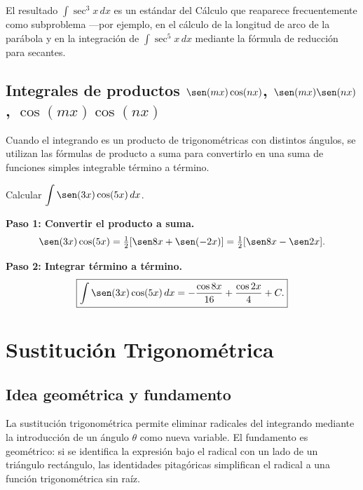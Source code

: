\begin{rem}
El resultado $\int\sec^3 x\,dx$ es un estándar del Cálculo que reaparece
frecuentemente como subproblema ---por ejemplo, en el cálculo de la longitud
de arco de la parábola y en la integración de $\int\sec^5 x\,dx$ mediante
la fórmula de reducción para secantes.
\end{rem}

\subsection{Integrales de productos $\sen(mx)\cos(nx)$, $\sen(mx)\sen(nx)$,
$\cos(mx)\cos(nx)$}

Cuando el integrando es un producto de trigonométricas con distintos ángulos,
se utilizan las fórmulas de producto a suma para convertirlo en una suma de
funciones simples integrable término a término.

\begin{example}
Calcular $\displaystyle\int \sen(3x)\cos(5x)\, dx$.

\begin{myproof}

\textbf{Paso 1: Convertir el producto a suma.}
\[
\sen(3x)\cos(5x) = \tfrac{1}{2}[\sen 8x + \sen(-2x)]
= \tfrac{1}{2}[\sen 8x - \sen 2x].
\]

\textbf{Paso 2: Integrar término a término.}
\[
\boxed{\int\sen(3x)\cos(5x)\,dx
= -\frac{\cos 8x}{16}+\frac{\cos 2x}{4}+C.}
\]
\end{myproof}
\end{example}

\section{Sustitución Trigonométrica}

\subsection{Idea geométrica y fundamento}

La sustitución trigonométrica permite eliminar radicales del integrando
mediante la introducción de un ángulo $\theta$ como nueva variable. El
fundamento es geométrico: si se identifica la expresión bajo el radical con
un lado de un triángulo rectángulo, las identidades pitagóricas simplifican
el radical a una función trigonométrica sin raíz.

